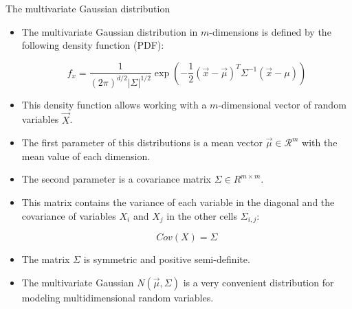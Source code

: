 \documentclass[handout]{beamer}
\begin{document}
\begin{frame}[fragile]{The multivariate Gaussian distribution}
\scriptsize{
\begin{itemize}
 
  \item The multivariate Gaussian distribution in $m$-dimensions is defined by the following density function (PDF):
  
  \begin{displaymath}
   f_x = \frac{1}{(2\pi)^{d/2}|\Sigma|^{1/2}}\exp \left( -\frac{1}{2}(\vec{x}-\vec{\mu})^T  \Sigma^{-1}(\vec{x}-\mu)\right)
  \end{displaymath}

  
\item This density function allows working with a $m$-dimensional vector of random variables $\vec{X}$.


\item The first parameter of this distributions is a mean vector $\vec{\mu} \in \mathcal{R}^m$ with the mean value of each dimension.

\item The second parameter is a covariance matrix $\Sigma \in R^{m\times m}$.

\item This matrix contains the variance of each variable in the diagonal and the covariance of variables $X_i$ and $X_j$ in the other cells $\Sigma_{i,j}$:

\begin{displaymath}
 Cov(X) = \Sigma
\end{displaymath}

\item The matrix $\Sigma$ is symmetric and positive semi-definite.
  
\item The multivariate Gaussian $N(\vec{\mu},\Sigma)$ is a very convenient distribution for modeling multidimensional random variables.
  
  
 
\end{itemize}
 

 
}
\end{frame}
\end{document}

